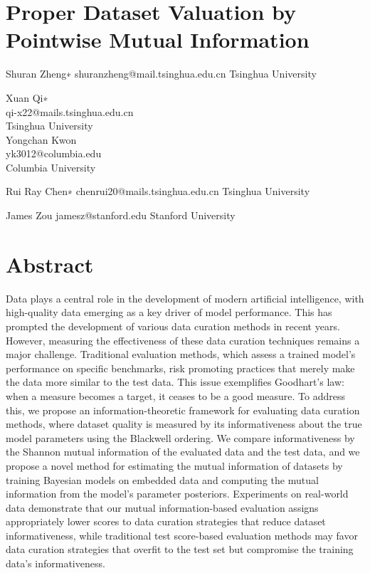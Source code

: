 


\section{Proper Dataset Valuation by Pointwise Mutual
Information}\label{proper-dataset-valuation-by-pointwise-mutual-information}

Shuran Zheng∗ shuranzheng@mail.tsinghua.edu.cn Tsinghua University

Xuan Qi∗\\
qi-x22@mails.tsinghua.edu.cn\\
Tsinghua University\\
Yongchan Kwon\\
yk3012@columbia.edu\\
Columbia University

Rui Ray Chen∗ chenrui20@mails.tsinghua.edu.cn Tsinghua University

James Zou jamesz@stanford.edu Stanford University

\section{Abstract}\label{abstract}

Data plays a central role in the development of modern artificial
intelligence, with high-quality data emerging as a key driver of model
performance. This has prompted the development of various data curation
methods in recent years. However, measuring the effectiveness of these
data curation techniques remains a major challenge. Traditional
evaluation methods, which assess a trained model's performance on
specific benchmarks, risk promoting practices that merely make the data
more similar to the test data. This issue exemplifies Goodhart's law:
when a measure becomes a target, it ceases to be a good measure. To
address this, we propose an information-theoretic framework for
evaluating data curation methods, where dataset quality is measured by
its informativeness about the true model parameters using the Blackwell
ordering. We compare informativeness by the Shannon mutual information
of the evaluated data and the test data, and we propose a novel method
for estimating the mutual information of datasets by training Bayesian
models on embedded data and computing the mutual information from the
model's parameter posteriors. Experiments on real-world data demonstrate
that our mutual information-based evaluation assigns appropriately lower
scores to data curation strategies that reduce dataset informativeness,
while traditional test score-based evaluation methods may favor data
curation strategies that overfit to the test set but compromise the
training data's informativeness.

